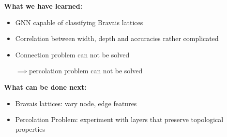 \vspace*{-0.3cm}
\textbf{What we have learned:}
\begin{itemize}
    \item GNN capable of classifying Bravais lattices
    \item Correlation between width, depth and accuracies rather complicated
    \item Connection problem can not be solved\par$\implies$percolation problem can not be solved
\end{itemize}
\textbf{What can be done next:}
\begin{itemize}
    \item Bravais lattices: vary node, edge features
    \item Percolation Problem: experiment with layers that preserve topological properties
\end{itemize}